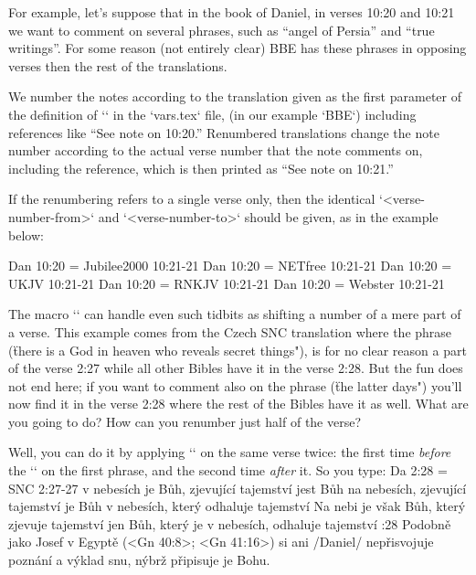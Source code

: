 For example, let's suppose that
in the book of Daniel, in verses 10:20 and 10:21 we want to comment on several phrases, such as 
“angel of Persia” and “true writings”. For some reason (not entirely clear) BBE has these phrases in 
opposing verses then the rest of the translations.

We number the notes according to the translation given as the first parameter of the definition of 
`\variants` in the `vars.tex` file, (in our example `BBE`) including references like “See note on 
10:20.”
Renumbered translations change the note number according to the actual verse number that the note 
comments on, including the reference, which is then printed as “See note on 10:21.”

If the renumbering refers to a single verse only, then the identical 
`<verse-number-from>` and `<verse-number-to>`  should be given, as in the example below:

\begtt
\renum Dan 10:20 = Jubilee2000 10:21-21
\renum Dan 10:20 = NETfree 10:21-21
\renum Dan 10:20 = UKJV 10:21-21
\renum Dan 10:20 = RNKJV 10:21-21
\renum Dan 10:20 = Webster 10:21-21
\endtt



%

The macro `\renum` can handle even such tidbits as shifting a number of a mere part of a verse.
This example comes from the Czech SNC translation where the phrase  (\"there is a God in heaven 
who reveals secret things"), is for no clear reason a part of the verse 2:27 while all other Bibles have it in the verse 2:28. 
But the fun does not end here; if you want to comment also on the phrase  (\"the latter days") you'll now find it in the verse 2:28
where the rest of the Bibles have it as well. What are you going to do? How can you renumber just half of the verse?

Well, you can do it by applying `\renum` on the same verse twice: the first time {\em before} the `\Note` on the first phrase, and the second time {\em after} it.
So you type:
\begtt
\renum Da 2:28 = SNC 2:27-27
    {v nebesích je Bůh, zjevující tajemství}            %
    {jest Bůh na nebesích, zjevující tajemství}         %
    {je Bůh v nebesích, který odhaluje tajemství}       %
    {Na nebi je však Bůh, který zjevuje tajemství}      %
    {jen Bůh, který je v nebesích, odhaluje tajemství}  %
:28 {} Podobně jako Josef v Egyptě (<Gn 40:8>; <Gn 41:16>) si ani \x/Daniel/
nepřisvojuje poznání a výklad snu, nýbrž připisuje je Bohu.

